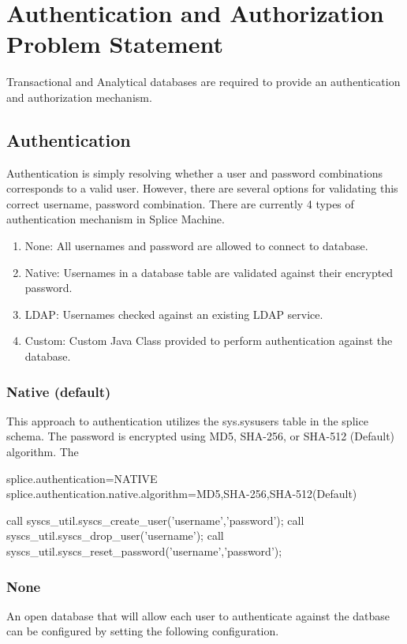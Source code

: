 \section{Authentication and Authorization Problem Statement}
Transactional and Analytical databases are required to provide an
authentication and authorization mechanism.

\subsection{Authentication}
Authentication is simply resolving whether a user and password combinations
corresponds to a valid user.  However, there are several options for validating
this correct username, password combination.  There are currently 4 types of
authentication mechanism in Splice Machine.

\begin{enumerate}
	\item None: All usernames and password are allowed to connect to database.
	\item Native: Usernames in a database table are validated against their
	encrypted password.
	\item LDAP: Usernames checked against an existing LDAP service.
	\item Custom: Custom Java Class provided to perform authentication against the
	database.
\end{enumerate}

\subsubsection{Native (default)}
This approach to authentication utilizes the sys.sysusers table in the splice
schema.  The password is encrypted using MD5, SHA-256, or
SHA-512 (Default) algorithm.  The 

splice.authentication=NATIVE
splice.authentication.native.algorithm=MD5,SHA-256,SHA-512(Default)

call syscs_util.syscs_create_user('username','password');
call syscs_util.syscs_drop_user('username');
call syscs_util.syscs_reset_password('username','password');


\subsubsection{None}
An open database that will allow each user to authenticate against the datbase
can be configured by setting the following configuration.

